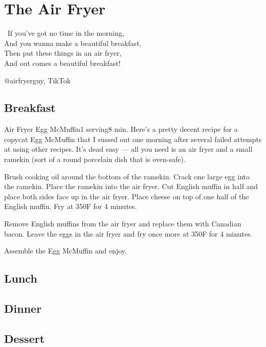 \chapter{The Air Fryer}
\label{chap:air-fryer}

\epigraph{
\twonotes~If you've got no time in the morning,\\
And you wanna make a beautiful breakfast,\\
Then put these things in an air fryer,\\
And out comes a beautiful breakfast!~\eighthnote
}{@airfryerguy, TikTok}

\section{Breakfast}
\label{sec:air-fryer-breakfast}

\begin{recipe}{Air Fryer Egg McMuffin}{1 serving}{8 min.}
\freeform Here's a pretty decent recipe for a copycat Egg McMuffin that I
sussed out one morning after several failed attempts at using other recipes.
It's dead easy --- all you need is an air fryer and a small ramekin (sort of
a round porcelain dish that is oven-safe).

Brush cooking oil around the bottom of the ramekin. Crack one large egg
into the ramekin. Place the ramekin into the air fryer. Cut English muffin
in half and place both sides face up in the air fryer. Place cheese on top of
one half of the English muffin.  Fry at 350\0F for 4 minutes.

Remove English muffins from the air fryer and replace them with Canadian bacon.
Leave the eggs in the air fryer and fry once more at 350\0F for 4 minutes.

\newstep Assemble the Egg McMuffin and enjoy.
\end{recipe}

\section{Lunch}
\label{sec:air-fryer-lunch}

\clearpage

\section{Dinner}
\label{sec:air-fryer-dinner}

\clearpage

\section{Dessert}
\label{sec:air-fryer-dessert}

\clearpage

